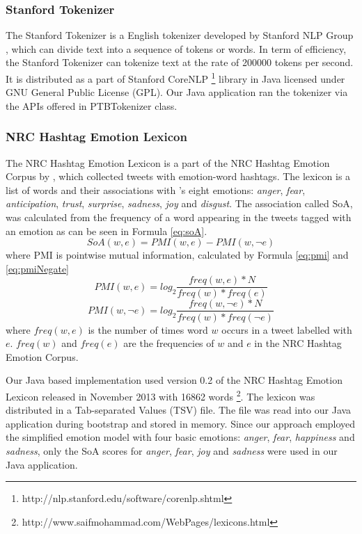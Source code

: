 \subsubsection{Stanford Tokenizer}
The Stanford Tokenizer is a English tokenizer developed by Stanford NLP Group \citep{manning-EtAl:2014:P14-5}, which can divide text into a sequence of tokens or words. In term of efficiency, the Stanford Tokenizer can tokenize text at the rate of 200000 tokens per second. It is distributed as a part of Stanford CoreNLP \footnote{http://nlp.stanford.edu/software/corenlp.shtml} library in Java licensed under GNU General Public License (GPL). Our Java application ran the tokenizer via the APIs offered in PTBTokenizer class.

\subsubsection{NRC Hashtag Emotion Lexicon}
The NRC Hashtag Emotion Lexicon is a part of the NRC Hashtag Emotion Corpus by \citet{mohammad2014using}, which collected tweets with emotion-word hashtags. The lexicon is a list of words and their associations with \citep{plutchik2001nature}'s eight emotions: \textit{anger}, \textit{fear}, \textit{anticipation}, \textit{trust}, \textit{surprise}, \textit{sadness}, \textit{joy} and \textit{disgust}. The association called SoA, was calculated from the frequency of a word appearing in the tweets tagged with an emotion as can be seen in Formula \ref{eq:soA}.
\begin{equation}
\label{eq:soA}
	SoA(w, e) = PMI(w, e) - PMI(w, \neg{e})
\end{equation}
where PMI is pointwise mutual information, calculated by Formula \ref{eq:pmi} and \ref{eq:pmiNegate}
\begin{equation}
\label{eq:pmi}
	PMI(w, e) = log_2\frac{freq(w, e) * N}{freq(w) * freq(e)}
\end{equation}
\begin{equation}
\label{eq:pmiNegate}
	PMI(w, \neg{e}) = log_2\frac{freq(w, \neg{e}) * N}{freq(w) * freq(\neg{e})}	
\end{equation}
where \(freq(w,e)\) is the number of times word \(w\) occurs in a tweet labelled with \(e\). \(freq(w)\) and \(freq(e)\) are the frequencies of \(w\) and \(e\) in the NRC Hashtag Emotion Corpus.

Our Java based implementation used version 0.2 of the NRC Hashtag Emotion Lexicon released in November 2013 with 16862 words \footnote{http://www.saifmohammad.com/WebPages/lexicons.html}. The lexicon was distributed in a Tab-separated Values (TSV) file. The file was read into our Java application during bootstrap and stored in memory. Since our approach employed the simplified emotion model with four basic emotions: \textit{anger}, \textit{fear}, \textit{happiness} and \textit{sadness}, only the SoA scores for \textit{anger}, \textit{fear}, \textit{joy} and \textit{sadness} were used in our Java application.


